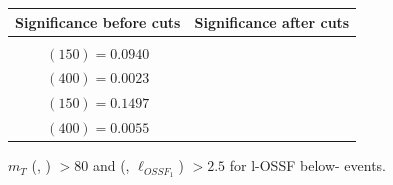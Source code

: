 \documentclass[letterpaper,12pt]{article}
\begin{document}
\begin{figure}[h]
  \vspace{0.6cm}
  \tiny
  \setlength{\tabcolsep}{20pt}
  \renewcommand{\arraystretch}{1.6}
  \begin{tabular}{|c|c|}
    \hline
    Significance before cuts & Significance after cuts\\
    \hline
    \Gape[0.2cm]{\makecell{
        \sig{} $(100) = 0.1192$\\
        \sig{} $(150) = 0.0940$\\
        \sig{} $(400) = 0.0023$ }} & 
    \makecell{
      \sig{} $(100) = 0.1828$\\
      \sig{} $(150) = 0.1497$\\
      \sig{} $(400) = 0.0055$}\\
    \hline
  \end{tabular}
  \caption{ $m_{T}$ (\ll, \met) $>80$ and \dphi{} (\lodd, $\ell_{OSSF_{1}}$) $>2.5$ for \3l-OSSF below-\Zboson{} events.}
  \label{fig:3lc3}
\end{figure}
\end{document}
